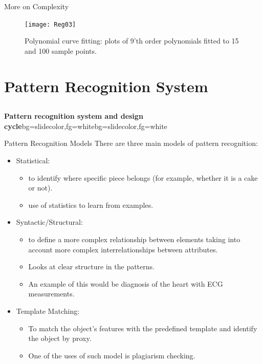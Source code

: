 \begin{frame}{More on Complexity}
\begin{figure}
\texttt{[image: Reg03]}
\caption{Polynomial curve fitting: plots of 9'th order polynomials fitted to 15 and 100 sample points.}
\end{figure}
\end{frame}

\section[PR Systems]{Pattern Recognition System}
\subsection{}

\begin{frame}{}
\begin{variableblock}{\centering \Large \textbf{\vspace{4pt}\newline Pattern recognition system and design cycle\vspace{4pt}}}{bg=slidecolor,fg=white}{bg=slidecolor,fg=white}
\end{variableblock}
\end{frame}


\begin{frame}{Pattern Recognition Models}
There are three main models of pattern recognition:
\setlength{\itemsep}{12pt}
\begin{itemize}
\item {\color{mycolor1}Statistical:} 
\begin{itemize}
\item to identify where specific piece belongs (for example, whether it is a cake or not).
\item use of statistics to learn from examples.
\end{itemize}


\item {\color{mycolor1}Syntactic/Structural:} 
\begin{itemize}
\item to define a more complex relationship between elements taking into account more complex interrelationships between attributes.
\item Looks at clear structure in the patterns.
\item An example of this would be diagnosis of the heart with ECG measurements.
\end{itemize}
\item {\color{mycolor1}Template Matching:}
\begin{itemize}
\item To match the object's features with the predefined template and identify the object by proxy. 
\item One of the uses of such model is plagiarism checking.
\end{itemize} 
\end{itemize}
\end{frame}

